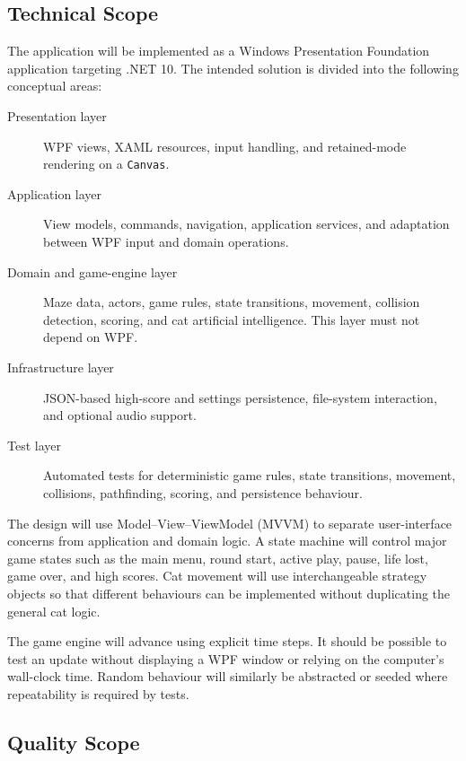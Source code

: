 \subsection{Technical Scope}

The application will be implemented as a Windows Presentation Foundation application targeting .NET 10. The intended solution is divided into the following conceptual areas:

\begin{description}
	\item[Presentation layer] WPF views, XAML resources, input handling, and retained-mode rendering on a \texttt{Canvas}.

	\item[Application layer] View models, commands, navigation, application services, and adaptation between WPF input and domain operations.

	\item[Domain and game-engine layer] Maze data, actors, game rules, state transitions, movement, collision detection, scoring, and cat artificial intelligence. This layer must not depend on WPF.

	\item[Infrastructure layer] JSON-based high-score and settings persistence, file-system interaction, and optional audio support.

	\item[Test layer] Automated tests for deterministic game rules, state transitions, movement, collisions, pathfinding, scoring, and persistence behaviour.
\end{description}

The design will use Model--View--ViewModel (MVVM) to separate user-interface concerns from application and domain logic. A state machine will control major game states such as the main menu, round start, active play, pause, life lost, game over, and high scores. Cat movement will use interchangeable strategy objects so that different behaviours can be implemented without duplicating the general cat logic.

The game engine will advance using explicit time steps. It should be possible to test an update without displaying a WPF window or relying on the computer's wall-clock time. Random behaviour will similarly be abstracted or seeded where repeatability is required by tests.

\subsection{Quality Scope}

